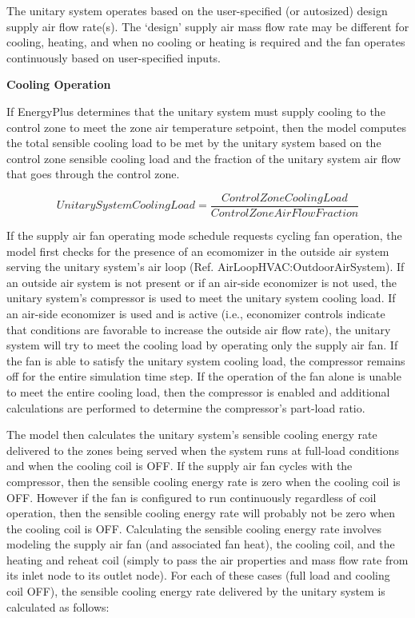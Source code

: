 The unitary system operates based on the user-specified (or autosized) design supply air flow rate(s). The `design' supply air mass flow rate may be different for cooling, heating, and when no cooling or heating is required and the fan operates continuously based on user-specified inputs.

\textbf{Cooling Operation}

If EnergyPlus determines that the unitary system must supply cooling to the control zone to meet the zone air temperature setpoint, then the model computes the total sensible cooling load to be met by the unitary system based on the control zone sensible cooling load and the fraction of the unitary system air flow that goes through the control zone.

\begin{equation}
UnitarySystemCoolingLoad = \frac{{ControlZoneCoolingLoad}}{{ControlZoneAirFlowFraction}}
\label{eq:UnitarySystemCoolingLoad}
\end{equation}

If the supply air fan operating mode schedule requests cycling fan operation, the model first checks for the presence of an ecomomizer in the outside air system serving the unitary system's air loop (Ref. AirLoopHVAC:OutdoorAirSystem). If an outside air system is not present or if an air-side economizer is not used, the unitary system's compressor is used to meet the unitary system cooling load. If an air-side economizer is used and is active (i.e., economizer controls indicate that conditions are favorable to increase the outside air flow rate), the unitary system will try to meet the cooling load by operating only the supply air fan. If the fan is able to satisfy the unitary system cooling load, the compressor remains off for the entire simulation time step. If the operation of the fan alone is unable to meet the entire cooling load, then the compressor is enabled and additional calculations are performed to determine the compressor's part-load ratio.

The model then calculates the unitary system's sensible cooling energy rate delivered to the zones being served when the system runs at full-load conditions and when the cooling coil is OFF. If the supply air fan cycles with the compressor, then the sensible cooling energy rate is zero when the cooling coil is OFF. However if the fan is configured to run continuously regardless of coil operation, then the sensible cooling energy rate will probably not be zero when the cooling coil is OFF. Calculating the sensible cooling energy rate involves modeling the supply air fan (and associated fan heat), the cooling coil, and the heating and reheat coil (simply to pass the air properties and mass flow rate from its inlet node to its outlet node). For each of these cases (full load and cooling coil OFF), the sensible cooling energy rate delivered by the unitary system is calculated as follows:

